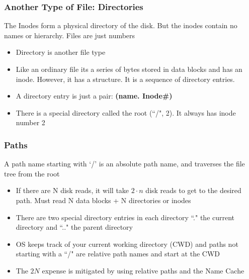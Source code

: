\subsubsection{Another Type of File: Directories}
The Inodes form a physical directory of the disk. But the inodes contain no names or hierarchy. Files are just numbers
\begin{itemize}
    \item Directory is another file type
    \item Like an ordinary file its a series of bytes stored in data blocks and has an inode. However, it has a structure. It is a sequence of directory entries.
    \item A directory entry is just a pair: \textbf{(name. Inode\#)}
    \item There is a special directory called the root (``/", 2). It always has inode number 2
\end{itemize}

\subsubsection{Paths}
A path name starting with `/' is an absolute path name, and traverses the file tree from the root
\begin{itemize}
    \item If there are N disk reads, it will take $2 \cdot n$ disk reads to get to the desired path. Must read N data blocks + N directories or inodes
    \item There are two special directory entries in each directory ``." the current directory and ``.." the parent directory
    \item OS keeps track of your current working directory (CWD) and paths not starting with a ``/" are relative path names and start at the CWD
    \item The $2N$ expense is mitigated by using relative paths and the Name Cache
\end{itemize}
